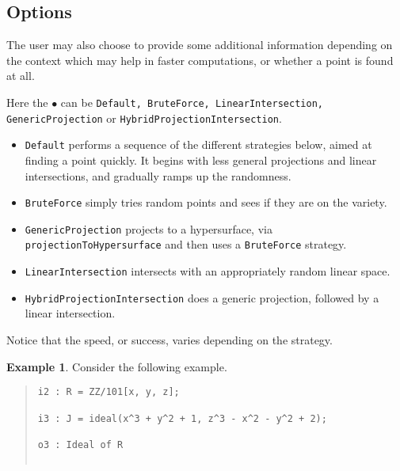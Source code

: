 \documentclass[11pt]{amsart}
\theoremstyle{definition}
\newtheorem{example}{Example}[section]
\begin{document}
    \subsection{Options}\label{strategydetails}

    The user may also choose to provide some additional information depending on the context which may help in faster computations, or whether a point is found at all.

    \begin{description}%
        \setlength{\itemsep}{5pt}
    \item[\tt Strategy => $\bullet$]   Here the $\bullet$ can be {\tt Default, BruteForce, LinearIntersection, \\ GenericProjection} or {\tt HybridProjectionIntersection}.

    \begin{itemize}
    \item {\tt Default} performs a sequence of the different strategies below, aimed at finding a point quickly.  It begins with less general projections and linear intersections, and gradually ramps up the randomness.  
    \item {\tt BruteForce} simply tries random points and sees if they are on the variety.
        
    \item {\tt GenericProjection} projects to a hypersurface, via 
        {\tt projectionToHypersurface} and then uses a {\tt BruteForce} strategy.
        
    \item {\tt LinearIntersection} intersects with an appropriately random linear space.
        
    \item {\tt HybridProjectionIntersection} does a generic projection, followed by a linear intersection. 		
    \end{itemize}

    Notice that the speed, or success, varies depending on the strategy.

    \begin{example}\label{BruteForce}
        Consider the following example.
        ~~        
        {\small\color{blue}
    \begin{quote}
\begin{verbatim}
i2 : R = ZZ/101[x, y, z];

i3 : J = ideal(x^3 + y^2 + 1, z^3 - x^2 - y^2 + 2);

o3 : Ideal of R


\end{verbatim}
\end{quote}}
\end{example}
\end{description}
\end{document}

